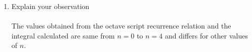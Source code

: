 \documentclass{article}
\begin{document}
\begin{enumerate}
\begin{enumerate}
\vspace{2cm}

\item Explain your observation \\ \\
 The values obtained from the octave script recurrence relation and the integral calculated are same from $n = 0$ to $n = 4$ and differs for other values of $n$.
\end{enumerate}

\end{enumerate}
\end{document}

